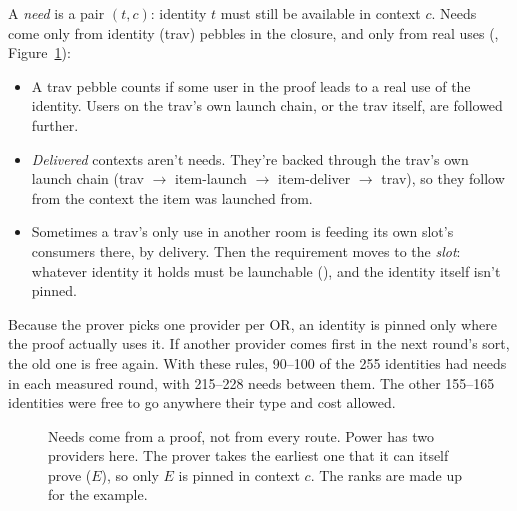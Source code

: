 A \emph{need} is a pair $(t,c)$: identity $t$ must still be available in context $c$. Needs come only from identity (trav) pebbles in the closure, and only from real uses (, Figure~\ref{fig:needs}):
\begin{itemize}
  \item A trav pebble counts if some user in the proof leads to a real use of the identity. Users on the trav's own launch chain, or the trav itself, are followed further.
  \item \emph{Delivered} contexts aren't needs. They're backed through the trav's own launch chain (trav $\to$ item-launch $\to$ item-deliver $\to$ trav), so they follow from the context the item was launched from.
  \item Sometimes a trav's only use in another room is feeding its own slot's consumers there, by delivery. Then the requirement moves to the \emph{slot}: whatever identity it holds must be launchable (), and the identity itself isn't pinned.
\end{itemize}
Because the prover picks one provider per OR, an identity is pinned only where the proof actually uses it. If another provider comes first in the next round's sort, the old one is free again. With these rules, 90--100 of the 255 identities had needs in each measured round, with 215--228 needs between them. The other 155--165 identities were free to go anywhere their type and cost allowed.

\begin{figure}[tbp]
\centering
{}
\caption{Needs come from a proof, not from every route. Power has two providers here. The prover takes the earliest one that it can itself prove ($E$), so only $E$ is pinned in context $c$. The ranks are made up for the example.}
\label{fig:needs}
\end{figure}

